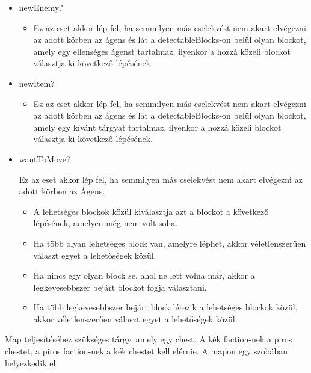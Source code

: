 \begin{itemize}
    \item newEnemy?

    \begin{itemize}
        \item Ez az eset akkor lép fel, ha semmilyen más cselekvést nem akart elvégezni az adott körben az ágens és lát a detectableBlocks-on belül olyan blockot,
            amely egy ellenséges ágenst tartalmaz, ilyenkor a hozzá közeli blockot választja ki következő lépésének.
    \end{itemize}

    \item newItem?

    \begin{itemize}
        \item Ez az eset akkor lép fel, ha semmilyen más cselekvést nem akart elvégezni az adott körben az ágens és lát a detectableBlocks-on belül olyan blockot,
        amely egy kívánt tárgyat tartalmaz, ilyenkor a hozzá közeli blockot választja ki következő lépésének.
    \end{itemize}

    \item wantToMove?
    
    Ez az eset akkor lép fel, ha semmilyen más cselekvést nem akart elvégezni az adott körben az Ágens.

    \begin{itemize}
        \item A lehetséges blockok közül kiválasztja azt a blockot a következő lépésének, amelyen még nem volt soha.
        \item Ha több olyan lehetséges block van, amelyre léphet, akkor véletlenszerűen választ egyet a lehetőségek közül.
        \item Ha nincs egy olyan block se, ahol ne lett volna már, akkor a legkevesebbszer bejárt blockot fogja választani.
        \item Ha több legkevesebbszer bejárt block létezik a lehetséges blockok közül, akkor véletlenszerűen választ egyet a lehetőségek közül.
    \end{itemize}
\end{itemize}


Map teljesítéséhez szükséges tárgy, amely egy chest. A kék faction-nek a piros chestet, a piros faction-nek a kék chestet kell elérnie.
A mapon egy szobában helyezkedik el.


